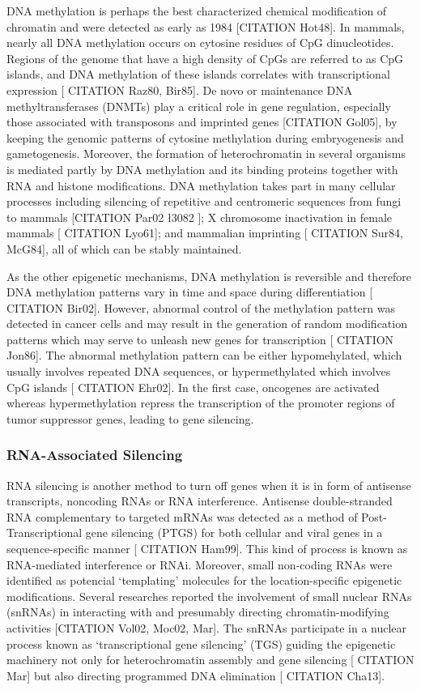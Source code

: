 DNA methylation is perhaps the best characterized chemical modification of chromatin and were detected as early as 1984 [CITATION Hot48]. In mammals, nearly all DNA methylation occurs on cytosine residues of CpG dinucleotides. Regions of the genome that have a high density of CpGs are referred to as CpG islands, and DNA methylation of these islands correlates with transcriptional expression [ CITATION Raz80, Bir85]. De novo or maintenance DNA methyltransferases (DNMTs) play a critical role in gene regulation, especially those associated with transposons and imprinted genes [CITATION Gol05], by keeping the genomic patterns of cytosine methylation during embryogenesis and gametogenesis. Moreover, the formation of heterochromatin in several organisms is mediated partly by DNA methylation and its binding proteins together with RNA and histone modifications. DNA methylation takes part in many cellular processes including silencing of repetitive and centromeric sequences from fungi to mammals [CITATION Par02 \l 3082 ]; X chromosome inactivation in female mammals [ CITATION Lyo61]; and mammalian imprinting [ CITATION Sur84, McG84], all of which can be stably maintained.

\medskip

As the other epigenetic mechanisms, DNA methylation is reversible and therefore DNA methylation patterns vary in time and space during differentiation [ CITATION Bir02]. However, abnormal control of the methylation pattern was detected in cancer cells and may result in the generation of random modification patterns which may serve to unleash new genes for transcription [ CITATION Jon86]. The abnormal methylation pattern can be either hypomehylated, which usually involves repeated DNA sequences, or hypermethylated which involves CpG islands [ CITATION Ehr02]. In the first case, oncogenes are activated whereas hypermethylation repress the transcription of the promoter regions of tumor suppressor genes, leading to gene silencing.

\subsubsection{RNA-Associated Silencing}

RNA silencing is another method to turn off genes when it is in form of antisense transcripts, noncoding RNAs or RNA interference. Antisense double-stranded RNA complementary to targeted mRNAs was detected as a method of Post-Transcriptional gene silencing (PTGS) for both cellular and viral genes in a sequence-specific manner [ CITATION Ham99]. This kind of process is known as RNA-mediated interference or RNAi. Moreover, small non-coding RNAs were identified as potencial ‘templating’ molecules for the location-specific epigenetic modifications. Several researches reported the involvement of small nuclear RNAs (snRNAs) in interacting with and presumably directing chromatin-modifying activities [CITATION Vol02, Moc02, Mar]. The snRNAs participate in a nuclear process known as ‘transcriptional gene silencing’ (TGS) guiding the epigenetic machinery not only for heterochromatin assembly and gene silencing [ CITATION Mar] but also directing programmed DNA elimination [ CITATION Cha13].

